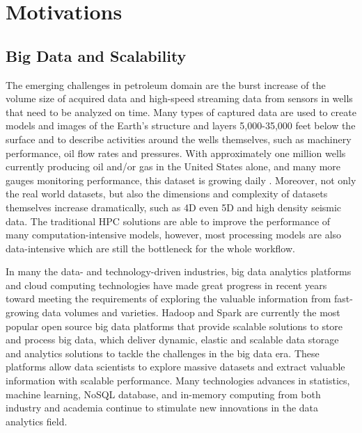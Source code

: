 \section{Motivations}

\subsection{Big Data and Scalability}

The emerging challenges in petroleum domain are the burst increase of the volume size of acquired data and high-speed streaming data from sensors in wells that need to be analyzed on time. Many types of captured data are used to create models and images of the Earth's structure and layers 5,000-35,000 feet below the surface and to describe activities around the wells themselves, such as machinery performance, oil flow rates and pressures. With approximately one million wells currently producing oil and/or gas in the United States alone, and many more gauges monitoring performance, this dataset is growing daily \cite{bigdataofindustry}. Moreover, not only the real world datasets, but also the dimensions and complexity of datasets themselves increase dramatically, such as 4D even 5D and high density seismic data. The traditional HPC solutions are able to improve the performance of many computation-intensive models, however,  most processing models are also data-intensive which are still the bottleneck for the whole workflow. 

In many the data- and technology-driven industries, big data analytics platforms and cloud computing technologies have made great progress in recent years toward meeting the requirements of exploring the valuable information from fast-growing data volumes and varieties.  Hadoop and Spark are currently the most popular open source big data platforms that provide scalable solutions to store and process big data, which deliver dynamic, elastic and scalable data storage and analytics solutions to tackle the challenges in the big data era. These platforms allow data scientists to explore massive datasets and extract valuable information with scalable performance. Many technologies advances in statistics, machine learning, NoSQL database, and in-memory computing from both industry and academia continue to stimulate new innovations in the data analytics field.

